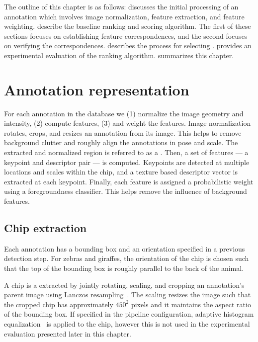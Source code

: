     The outline of this chapter is as follows:  discusses the initial processing of an
    annotation which involves image normalization, feature extraction, and feature weighting.
     describe the baseline ranking and scoring algorithm. The first of these
    sections focuses on establishing feature correspondences, and the second focuses on verifying the
    correspondences.  describes the process for selecting \exemplars{}.
     provides an experimental evaluation of the ranking algorithm.
     summarizes this chapter.

    \rankedmatches{}

\section{Annotation representation}\label{sec:annotrepr}
  
    For each annotation in the database we (1) normalize the image geometry and intensity, (2) compute features,
    (3) and weight the features.
    Image normalization rotates, crops, and resizes an annotation from its image. This helps to remove background
    clutter and roughly align the annotations in pose and scale. The extracted and normalized region is referred to
    as a .
    Then, a set of features ---  a keypoint and descriptor pair --- is computed. Keypoints are detected at multiple
    locations and scales within the chip, and a texture based descriptor vector is extracted at each keypoint.
    Finally, each feature is assigned a probabilistic weight using a foregroundness classifier. This helps remove
    the influence of background features.

    \subsection{Chip extraction}

        Each annotation has a bounding box and an orientation specified in a previous detection step. For zebras
        and giraffes, the orientation of the chip is chosen such that the top of the bounding box is roughly
        parallel to the back of the animal.

        A chip is a extracted by jointly rotating, scaling, and cropping an annotation's parent image using Lanczos
        resampling~\cite{lanczos_applied_1988}. The scaling resizes the image such that the cropped chip has
        approximately $450^2$ pixels and it maintains the aspect ratio of the bounding box. If specified in the
        pipeline configuration, adaptive histogram equalization~\cite{pizer_adaptive_1987} is applied to the chip,
        however this is not used in the experimental evaluation presented later in this chapter.

